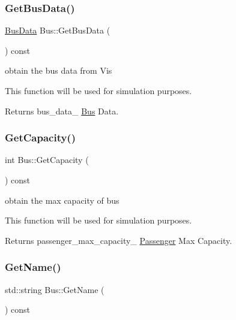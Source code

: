 \subsubsection{\texorpdfstring{Get\+Bus\+Data()}{GetBusData()}}
{\footnotesize\ttfamily \hyperlink{structBusData}{Bus\+Data} Bus\+::\+Get\+Bus\+Data (\begin{DoxyParamCaption}{ }\end{DoxyParamCaption}) const}



obtain the bus data from Vis 

This function will be used for simulation purposes.

\begin{DoxyReturn}{Returns}
bus\+\_\+data\+\_\+ \hyperlink{classBus}{Bus} Data. 
\end{DoxyReturn}
\mbox{\label{classBus_a3a1f68e9e2548f981d0150901918922c}} 
\subsubsection{\texorpdfstring{Get\+Capacity()}{GetCapacity()}}
{\footnotesize\ttfamily int Bus\+::\+Get\+Capacity (\begin{DoxyParamCaption}{ }\end{DoxyParamCaption}) const\hspace{0.3cm}{\ttfamily [inline]}}



obtain the max capacity of bus 

This function will be used for simulation purposes.

\begin{DoxyReturn}{Returns}
passenger\+\_\+max\+\_\+capacity\+\_\+ \hyperlink{classPassenger}{Passenger} Max Capacity. 
\end{DoxyReturn}
\mbox{\label{classBus_a2143b0563ad48b1b67e114d1ba5342ca}} 
\subsubsection{\texorpdfstring{Get\+Name()}{GetName()}}
{\footnotesize\ttfamily std\+::string Bus\+::\+Get\+Name (\begin{DoxyParamCaption}{ }\end{DoxyParamCaption}) const\hspace{0.3cm}{\ttfamily [inline]}}



